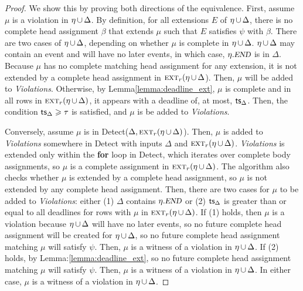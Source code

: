 \begin{proof}
  We show this by proving both directions of the equivalence.
  First,
  assume $\mu$ is a violation in $\eta\,{\cup}\,\Delta$.
  By definition,
  for all extensions $E$ of $\eta\,{\cup}\,\Delta$,
  there is no complete head assignment $\beta$ that extends $\mu$
  such that $E$ satisfies $\psi$ with $\beta$.
  There are two cases of $\eta\,{\cup}\,\Delta$,
  depending on whether $\mu$ is complete in $\eta\,{\cup}\,\Delta$.
  $\eta\,{\cup}\,\Delta$ may contain an {\End} event
  and will have no later events,
  in which case,
  $\eta.\textsl{\small END}$ is in $\Delta$.
  Because $\mu$ has no complete matching head assignment for any
  extension,
  it is not extended by a complete head assignment in
  $\textsc{ext}_r(\eta\,{\cup}\,\Delta$).
  Then,
  $\mu$ will be added to {\it Violations}.
  Otherwise,
  by Lemma\:\ref{lemma:deadline_ext},
  $\mu$ is complete and
  in all rows in $\textsc{ext}_r(\eta\,{\cup}\,\Delta)$,
  it appears with a deadline of, at most, $\textsf{ts}_\Delta$.
  Then, the condition $\textsf{ts}_\Delta \geqslant \tau$ is satisfied,
  and $\mu$ is be added to {\it Violations}.
  
  Conversely,
  assume $\mu$ is in
  {\sf Detect}($\Delta,\textsc{ext}_r(\eta\,{\cup}\,\Delta)$).
  Then, $\mu$ is added to {\it Violations} somewhere in {\sf Detect}
  with inputs $\Delta$ and $\textsc{ext}_r(\eta\,{\cup}\,\Delta)$.
  {\it Violations} is extended only within
  the {\bf for} loop in {\sf Detect},
  which iterates over complete body assignments,
  so $\mu$ is a complete assignment in $\textsc{ext}_r(\eta\,{\cup}\,\Delta)$.
  The algorithm also checks whether $\mu$ is extended by a complete
  head assignment,
  so $\mu$ is not extended by any complete head assignment.
  Then, there are two cases for $\mu$ to be added to {\it Violations}:
  either (1) $\Delta$ contains $\eta.\textsl{\small END}$
  or
  (2) $\textsf{ts}_\Delta$ is greater than or equal to all deadlines
  for rows with $\mu$ in $\textsc{ext}_r(\eta\,{\cup}\,\Delta)$.
  If (1) holds,
  then $\mu$ is a violation because
  $\eta\,{\cup}\,\Delta$
  will have no later events,
  so no future complete head assignment will be created for
  $\eta\,{\cup}\,\Delta$,
  so no future complete head assignment matching $\mu$ will satisfy
  $\psi$. 
  Then, $\mu$ is a witness of a violation in $\eta\,{\cup}\,\Delta$.
  If (2) holds,
  by Lemma:\ref{lemma:deadline_ext},
  so no future complete head assignment matching $\mu$ will satisfy
  $\psi$. 
  Then, $\mu$ is a witness of a violation in $\eta\,{\cup}\,\Delta$.
  In either case,
  $\mu$ is a witness of a violation in $\eta\,{\cup}\,\Delta$.
\end{proof}

